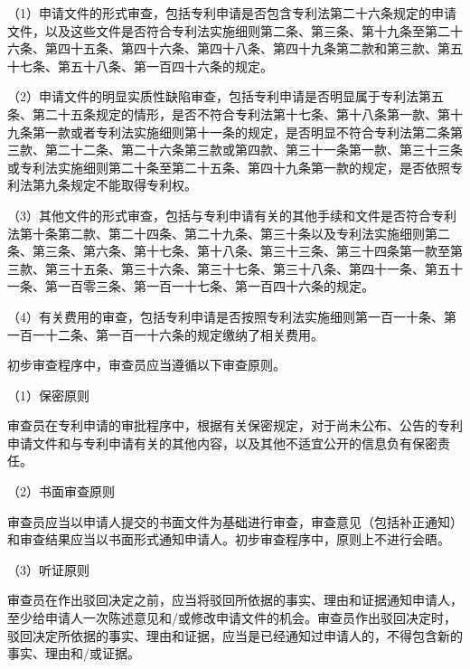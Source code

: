 
{\setlength{\parindent}{17.1bp}（1）申请文件的形式审查，包括专利申请是否包含专利法第二十六条规定的申请文件，以及这些文件是否符合专利法实施细则第二条、第三条、第十九条至第二十六条、第四十五条、第四十六条、第四十八条、第四十九条第二款和第三款、第五十七条、第五十八条、第一百四十六条的规定。\par}

{\setlength{\parindent}{17.1bp}（2）申请文件的明显实质性缺陷审查，包括专利申请是否明显属于专利法第五条、第二十五条规定的情形，是否不符合专利法第十七条、第十八条第一款、第十九条第一款或者专利法实施细则第十一条的规定，是否明显不符合专利法第二条第三款、第二十二条、第二十六条第三款或第四款、第三十一条第一款、第三十三条或专利法实施细则第二十条至第二十五条、第四十九条第一款的规定，是否依照专利法第九条规定不能取得专利权。\par}

{\setlength{\parindent}{17.1bp}（3）其他文件的形式审查，包括与专利申请有关的其他手续和文件是否符合专利法第十条第二款、第二十四条、第二十九条、第三十条以及专利法实施细则第二条、第三条、第六条、第十七条、第十八条、第三十三条、第三十四条第一款至第三款、第三十五条、第三十六条、第三十七条、第三十八条、第四十一条、第五十一条、第一百零三条、第一百一十七条、第一百四十六条的规定。\par}

{\setlength{\parindent}{17.1bp}（4）有关费用的审查，包括专利申请是否按照专利法实施细则第一百一十条、第一百一十二条、第一百一十六条的规定缴纳了相关费用。\par}

初步审查程序中，审查员应当遵循以下审查原则。

{\setlength{\parindent}{17.1bp}（1）保密原则\par}

审查员在专利申请的审批程序中，根据有关保密规定，对于尚未公布、公告的专利申请文件和与专利申请有关的其他内容，以及其他不适宜公开的信息负有保密责任。

{\setlength{\parindent}{17.1bp}（2）书面审查原则\par}

审查员应当以申请人提交的书面文件为基础进行审查，审查意见（包括补正通知）和审查结果应当以书面形式通知申请人。初步审查程序中，原则上不进行会晤。

{\setlength{\parindent}{17.1bp}（3）听证原则\par}

审查员在作出驳回决定之前，应当将驳回所依据的事实、理由和证据通知申请人，至少给申请人一次陈述意见和/或修改申请文件的机会。审查员作出驳回决定时，驳回决定所依据的事实、理由和证据，应当是已经通知过申请人的，不得包含新的事实、理由和/或证据。


